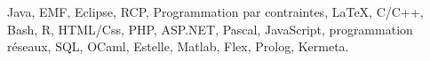 
\noindent
Java, EMF, Eclipse, RCP, Programmation par contraintes, \LaTeX, C/C++, Bash, R, HTML/Css, PHP, ASP.NET, Pascal, JavaScript, programmation réseaux, SQL, OCaml, Estelle, Matlab, Flex, Prolog, Kermeta. \\
